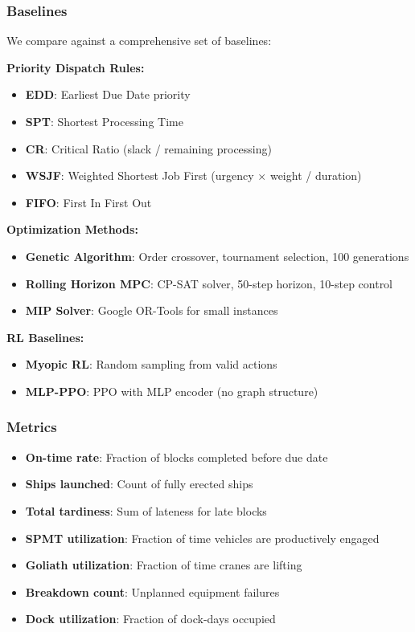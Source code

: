 \documentclass[11pt,a4paper]{article}
\begin{document}
\subsubsection{Baselines}

We compare against a comprehensive set of baselines:

\textbf{Priority Dispatch Rules:}
\begin{itemize}
    \item \textbf{EDD}: Earliest Due Date priority
    \item \textbf{SPT}: Shortest Processing Time
    \item \textbf{CR}: Critical Ratio (slack / remaining processing)
    \item \textbf{WSJF}: Weighted Shortest Job First (urgency $\times$ weight / duration)
    \item \textbf{FIFO}: First In First Out
\end{itemize}

\textbf{Optimization Methods:}
\begin{itemize}
    \item \textbf{Genetic Algorithm}: Order crossover, tournament selection, 100 generations
    \item \textbf{Rolling Horizon MPC}: CP-SAT solver, 50-step horizon, 10-step control
    \item \textbf{MIP Solver}: Google OR-Tools for small instances
\end{itemize}

\textbf{RL Baselines:}
\begin{itemize}
    \item \textbf{Myopic RL}: Random sampling from valid actions
    \item \textbf{MLP-PPO}: PPO with MLP encoder (no graph structure)
\end{itemize}

\subsubsection{Metrics}

\begin{itemize}
    \item \textbf{On-time rate}: Fraction of blocks completed before due date
    \item \textbf{Ships launched}: Count of fully erected ships
    \item \textbf{Total tardiness}: Sum of lateness for late blocks
    \item \textbf{SPMT utilization}: Fraction of time vehicles are productively engaged
    \item \textbf{Goliath utilization}: Fraction of time cranes are lifting
    \item \textbf{Breakdown count}: Unplanned equipment failures
    \item \textbf{Dock utilization}: Fraction of dock-days occupied
\end{itemize}
\end{document}
